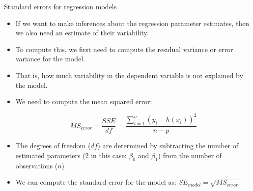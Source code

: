 \documentclass[handout]{beamer}
\begin{document}
\begin{frame}{Standard errors for regression models}
\scriptsize{
\begin{itemize}
 \item If we want to make inferences about the regression parameter estimates, then we also need an estimate of their variability. \cite{poldrack2019statistical}
 \item To compute this, we first need to compute the residual variance or error variance for the model.
 \item That is, how much variability in the dependent variable is not explained by the model. 
 \item We need to compute the mean squared error:
 
 \begin{displaymath}
  MS_{error} = \frac{SSE}{df} = \frac{\sum_{i=1}^{n} (y_i-h(x_i))^2}{n-p}
 \end{displaymath}

 \item The degrees of freedom ($df$) are determined by subtracting the number of estimated parameters (2 in this case: $\beta_0$ and $\beta_1$) from the number of observations ($n$)

 \item  We can compute the standard error for the model as: $SE_{model} = \sqrt{MS_{error}}$
 


 
\end{itemize}


}
 
\end{frame}
\end{document}
